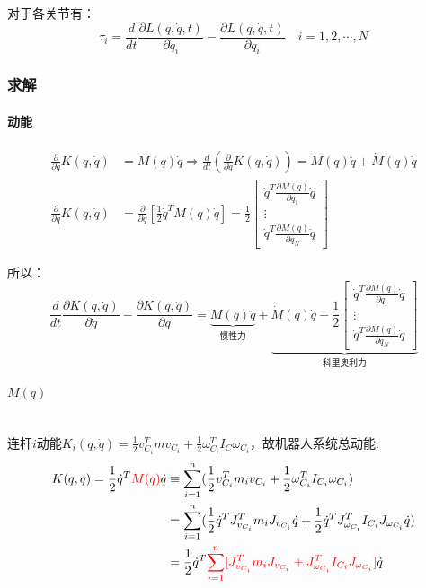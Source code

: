 \documentclass[
12pt, %
a4paper, 
oneside, %
headinclude,footinclude, %
]{scrartcl}
\begin{document}
对于各关节有：
$$ \tau_i = \frac{d}{dt}\frac{\partial L(q, \dot{q}, t)}{\partial \dot{q}_i} - \frac{\partial L(q, \dot{q}, t)}{\partial q_i} \quad i = 1, 2, \cdots, N $$
\subsubsection[求解]{求解}
\paragraph{动能}
\begin{align*}
\frac{\partial}{\partial\dot{q}}K(q, \dot{q}) &= M(q) \dot{q} \Rightarrow \frac{d}{dt}(\frac{\partial}{\partial \dot{q}}K(q, \dot{q})) = M(q) \ddot{q} + \dot{M}(q) \dot{q} \\
\frac{\partial}{\partial q}K(q, \dot{q}) &= \frac{\partial}{\partial q}[\frac{1}{2}\dot{q}^T M(q) \dot{q}] = \frac{1}{2} \begin{bmatrix} \dot{q}^T \frac{\partial M(q)}{\partial q_1}\dot{q} \\ \vdots \\ \dot{q}^T \frac{\partial M(q)}{\partial q_N}\dot{q} \end{bmatrix}
\end{align*}

所以：
$$ \frac{d}{dt}\frac{\partial K(q, \dot{q})}{\partial\dot{q}} - \frac{\partial K(q, \dot{q})}{\partial q} = \underbrace{M(q) \ddot{q}}_{\text{惯性力}} + \underbrace{\dot{M}(q) \dot{q} - \frac{1}{2}\begin{bmatrix} \dot{q}^T \frac{\partial M(q)}{\partial q_1}\dot{q} \\ \vdots \\ \dot{q}^T \frac{\partial M(q)}{\partial q_N}\dot{q} \end{bmatrix}}_{\text{科里奥利力}} $$
\paragraph{$ M(q) $}\label{sec:bingxing_back2}~\\

连杆$ i $动能$ K_i(q, \dot{q}) = \frac{1}{2}v_{C_i}^T mv_{C_i} + \frac{1}{2}\omega_{C_i}^T I_C \omega_{C_i} $，故机器人系统总动能:
\begin{align*}
K(q, \dot{q}) = \frac{1}{2}\dot{q}^T \textcolor{red}{M(q)} \dot{q} &\equiv \sum_{i = 1}^{n}(\frac{1}{2}v_{C_i}^T m_i v_{C_i} + \frac{1}{2}\omega_{C_i}^T I_{C_i} \omega_{C_i}) \\
&= \sum_{i = 1}^{n}(\frac{1}{2}\dot{q}^T J_{v_{C_i}}^T m_i J_{v_{C_i}} \dot{q} + \frac{1}{2}\dot{q}^T J_{\omega_{C_i}}^T I_{C_i} J_{\omega_{C_i}} \dot{q}) \\
&= \frac{1}{2}\dot{q}^T \textcolor{red}{\sum_{i = 1}^{n}[J_{v_{C_i}}^T m_i J_{v_{C_i}} + J_{\omega_{C_i}}^T I_{C_i} J_{\omega_{C_i}}]} \dot{q}
\end{align*}
\end{document}
